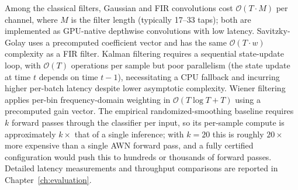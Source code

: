 Among the classical filters, Gaussian and FIR convolutions cost
$\mathcal{O}(T \cdot M)$ per channel, where $M$ is the filter length
(typically 17--33 taps); both are implemented as GPU-native depthwise
convolutions with low latency. Savitzky-Golay uses a precomputed coefficient
vector and has the same $\mathcal{O}(T \cdot w)$ complexity as a FIR filter.
Kalman filtering requires a sequential state-update loop, with
$\mathcal{O}(T)$ operations per sample but poor parallelism (the state
update at time $t$ depends on time $t-1$), necessitating a CPU fallback
and incurring higher per-batch latency despite lower asymptotic complexity.
Wiener filtering applies per-bin frequency-domain weighting in
$\mathcal{O}(T \log T + T)$ using a precomputed gain vector.
The empirical randomized-smoothing baseline requires $k$ forward passes
through the classifier per input, so its per-sample compute is
approximately $k \times$ that of a single inference; with $k = 20$ this
is roughly $20 \times$ more expensive than a single AWN forward pass, and
a fully certified configuration would push this to hundreds or thousands
of forward passes. Detailed latency measurements and throughput
comparisons are reported in Chapter~\ref{ch:evaluation}.
